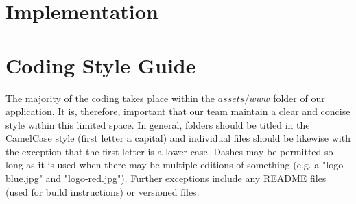 \documentclass[12pt]{article}
\begin{document}
\section{Implementation}
\label{sec:implementation}
%         

\section{Coding Style Guide}

The majority of the coding takes place within the $assets/www$ folder of our application.  It is, therefore, important that our team maintain a clear and concise style within this limited space.  In general, folders should be titled in the CamelCase style (first letter a capital) and individual files should be likewise with the exception that the first letter is a lower case.  Dashes may be permitted so long as it is used when there may be multiple editions of something (e.g. a "logo-blue.jpg" and "logo-red.jpg").  Further exceptions include any README files (used for build instructions) or versioned files. 
\end{document}
